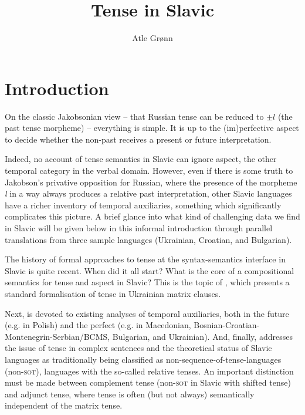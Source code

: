 \documentclass[output=paper,colorlinks,citecolor=brown]{langscibook}
\author{Atle Grønn\orcid{0000-0003-3875-5487}\affiliation{University of Oslo}}
\title{Tense in Slavic}
\begin{document}
\maketitle

% 

\section{Introduction}\label{gronn:intro}

On the classic Jakobsonian view \citep{jakobson32} -- that Russian tense can be reduced to $\pm l$ (the past tense morpheme) -- everything is simple. It is up to the (im)perfective aspect to decide whether the non-past receives a present or future interpretation.

Indeed, no account of tense semantics in Slavic can ignore aspect, the other temporal category in the verbal domain. However, even if there is some truth to  Jakobson's  privative opposition for Russian, where the presence of the morpheme \textit{l} in a way always produces a relative past interpretation, other Slavic languages have a richer inventory of temporal auxiliaries, something which significantly complicates this picture. A brief glance into what kind of challenging data we find in Slavic will be given below in this informal introduction through parallel translations  from three sample languages (Ukrainian, Croatian, and Bulgarian). 

The history of formal approaches to tense at the syntax-semantics interface  in Slavic is quite recent. When did it all start? What is the core of a compositional semantics for tense and aspect in Slavic? This is the topic of , which presents a standard formalisation of tense in Ukrainian matrix clauses. 

Next,  is devoted to existing analyses of temporal auxiliaries, both in the future (e.g. in Polish) and the perfect (e.g. in Macedonian, Bosnian-Croatian-Montenegrin-Serbian/BCMS, Bulgarian, and Ukrainian). And, finally,  addresses the issue of tense in complex sentences and the theoretical status of Slavic languages as traditionally being classified as non-sequence-of-tense-languages (non-\textsc{sot}), languages with the so-called relative tenses. An important distinction must be made between complement tense (non-\textsc{sot} in Slavic with shifted tense) and adjunct tense, where tense is often (but not always) semantically independent of the matrix tense.
\end{document}
